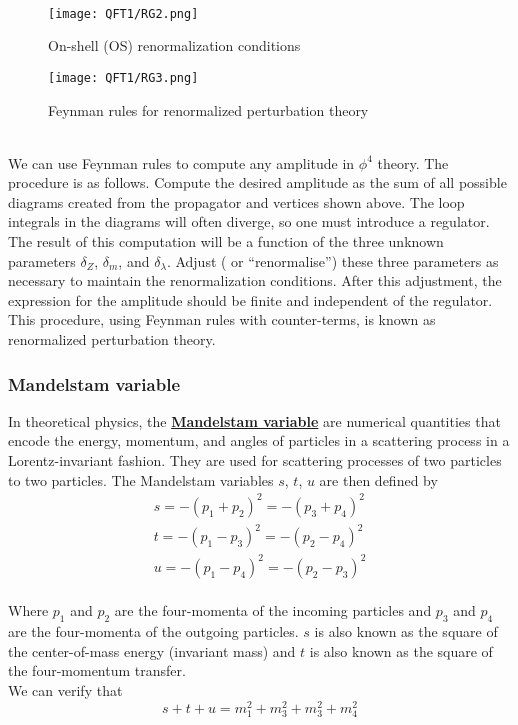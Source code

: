 \\
\begin{figure}[!h]
\centering
\texttt{[image: QFT1/RG2.png]}
\caption{On-shell (OS) renormalization conditions}
\end{figure}
\begin{figure}[!h]
\centering
\texttt{[image: QFT1/RG3.png]}
\caption{Feynman rules for renormalized perturbation theory}
\end{figure}
\\
We can use Feynman rules to compute any amplitude in $\phi^4$ theory. The procedure is as follows. Compute the desired amplitude as the sum of all possible diagrams created from the propagator and vertices shown above. The loop integrals in the diagrams will often diverge, so one must introduce a regulator. The result of this computation will be a function of the three unknown parameters $\delta_Z$, $\delta_m$, and $\delta_{\lambda}$. Adjust ( or ``renormalise'') these three parameters as necessary to maintain the renormalization conditions. After this adjustment, the expression for the amplitude should be finite and independent of the regulator.
\\
This procedure, using Feynman rules with counter-terms, is known as renormalized perturbation theory. 

\subsubsection{Mandelstam variable}
In theoretical physics, the \href{https://en.wikipedia.org/wiki/Mandelstam_variables}{\textbf{Mandelstam variable}}  are numerical quantities that encode the energy, momentum, and angles of particles in a scattering process in a Lorentz-invariant fashion. They are used for scattering processes of two particles to two particles. 
The Mandelstam variables $s$, $t$, $u$ are then defined by
\begin{eqnarray}
s=-(p_{1}+p_{2})^{2}=-(p_{3}+p_{4})^{2} \nonumber \\
t=-(p_{1}-p_{3})^{2}=-(p_{2}-p_{4})^{2} \nonumber \\
u=-(p_{1}-p_{4})^{2}=-(p_{2}-p_{3})^{2} \nonumber
\end{eqnarray}
\\
Where $p_1$ and $p_2$ are the four-momenta of the incoming particles and $p_3$ and $p_4$ are the four-momenta of the outgoing particles.
$s$ is also known as the square of the center-of-mass energy (invariant mass) and $t$ is also known as the square of the four-momentum transfer.\\
We can verify that
\[s+t+u = m_1^2 + m_3^2 + m_3^2 +m_4^2\]

